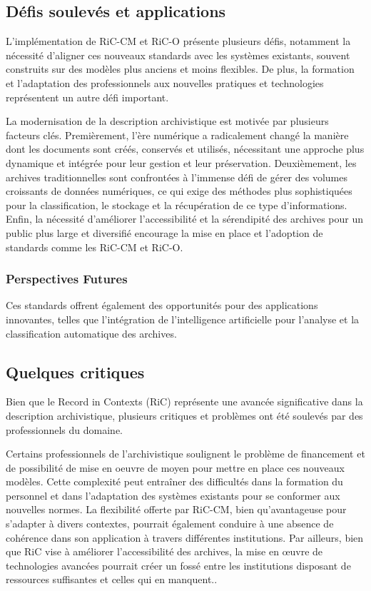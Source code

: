 \documentclass[12pt]{report}
\begin{document}
\subsection{Défis soulevés et applications}

L'implémentation de RiC-CM et RiC-O présente plusieurs défis, notamment la nécessité d'aligner ces nouveaux standards avec les systèmes existants, souvent construits sur des modèles plus anciens et moins flexibles\autocite{Duranti2001Impact}. De plus, la formation et l'adaptation des professionnels aux nouvelles pratiques et technologies représentent un autre défi important.

La modernisation de la description archivistique est motivée par plusieurs facteurs clés. Premièrement, l'ère numérique a radicalement changé la manière dont les documents sont créés, conservés et utilisés, nécessitant une approche plus dynamique et intégrée pour leur gestion et leur préservation. Deuxièmement, les archives traditionnelles sont confrontées à l'immense défi de gérer des volumes croissants de données numériques, ce qui exige des méthodes plus sophistiquées pour la classification, le stockage et la récupération de ce type d'informations. Enfin, la nécessité d'améliorer l'accessibilité et la sérendipité des archives pour un public plus large et diversifié encourage la mise en place et l'adoption de standards comme les RiC-CM et RiC-O.

\subsubsection{Perspectives Futures}
Ces standards offrent également des opportunités pour des applications innovantes, telles que l'intégration de l'intelligence artificielle pour l'analyse et la classification automatique des archives\autocite{Spina2023AI, ColavizzaBlankeJeurgensetAl2021}.

\subsection{Quelques critiques}
Bien que le Record in Contexts (RiC) représente une avancée significative dans la description archivistique, plusieurs critiques et problèmes ont été soulevés par des professionnels du domaine.

Certains professionnels de l'archivistique soulignent le problème de financement et de possibilité de mise en oeuvre de moyen pour mettre en place ces nouveaux modèles. Cette complexité peut entraîner des difficultés dans la formation du personnel et dans l'adaptation des systèmes existants pour se conformer aux nouvelles normes. La flexibilité offerte par RiC-CM, bien qu'avantageuse pour s'adapter à divers contextes, pourrait également conduire à une absence de cohérence dans son application à travers différentes institutions.
Par ailleurs, bien que RiC vise à améliorer l'accessibilité des archives, la mise en œuvre de technologies avancées pourrait créer un fossé entre les institutions disposant de ressources suffisantes et celles qui en manquent\autocite{RokeTillman2022PragmaticPrinciples}..
\end{document}
